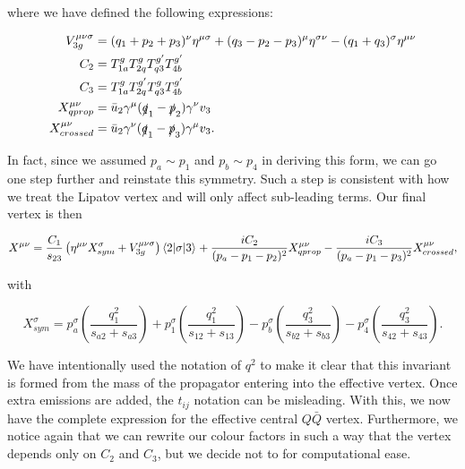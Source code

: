 where we have defined the following expressions: %

\begin{subequations}
\begin{align}
V_{3g}^{\mu \nu \sigma} &= (q_1 + p_2 + p_3)^\nu \eta^{\mu \sigma} + (q_3 - p_2 -p_3)^\mu \eta^{\sigma \nu} - (q_1 + q_3)^\sigma \eta^{\mu \nu} \\
C_2 &= T^g_{1a}T^g_{2q}T^{g'}_{q3}T^{g'}_{4b} \\
C_3 &= T^g_{1a}T^{g'}_{2q}T^g_{q3}T^{g'}_{4b} \\
X_{qprop}^{\mu \nu} &= \bar{u}_2 \gamma^\mu (\slashed{q}_1 - \slashed{p}_2)\gamma^\nu v_3 \\
X_{crossed}^{\mu \nu} &=\bar{u}_2 \gamma^\nu (\slashed{q}_1 - \slashed{p}_3)\gamma^\mu v_3.
\end{align}
\end{subequations}

In fact, since we assumed $p_a \sim p_1$ and $p_b \sim p_4$ in deriving this form, we can go one step further and reinstate this symmetry. Such a step is consistent with how we treat the Lipatov vertex and will only affect sub-leading terms. Our final vertex is then

\begin{equation}
X^{\mu \nu} = \frac{C_1}{s_{23}} \left(\eta^{\mu \nu} X_{sym}^\sigma + V^{\mu \nu \sigma}_{3g} \right) \mathinner{\langle2\vert\sigma\vert3\rangle}_{} + \frac{i C_2}{(p_a-p_1-p_2)^2} X^{\mu \nu}_{qprop} - \frac{i C_3}{(p_a-p_1-p_3)^2} X^{\mu \nu}_{crossed},
\end{equation}

with

\begin{equation}
X_{sym}^\sigma = p_a^\sigma \left( \frac{q_1^2}{s_{a2}+s_{a3}} \right) + p_1^\sigma \left( \frac{q_1^2}{s_{12}+s_{13}} \right) 
- p_b^\sigma \left( \frac{q_3^2}{s_{b2}+s_{b3}} \right) - p_4^\sigma \left( \frac{q_3^2}{s_{42}+s_{43}} \right).
\end{equation}

We have intentionally used the notation of $q^2$ to make it clear that this invariant is formed from the mass of the propagator entering into the effective vertex. Once extra emissions are added, the $t_{ij}$ notation can be misleading. With this, we now have the complete expression for the effective central $Q\bar{Q}$ vertex. Furthermore, we notice again that we can rewrite our colour factors in such a way that the vertex depends only on $C_2$ and $C_3$, but we decide not to for computational ease. 

